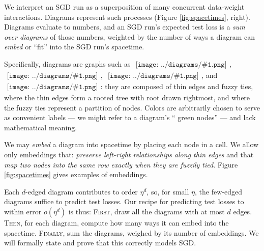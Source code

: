 \documentclass{article}
\newcommand{\sdia}[1]{\begin{gathered}\texttt{[image: ../diagrams/\#1.png]}\end{gathered}}
\begin{document}
            We interpret an SGD run as a superposition of many concurrent
            data-weight interactions.  Diagrams represent such
            processes (Figure \ref{fig:spacetimes}, right).  Diagrams evaluate
            to numbers, and an SGD run's expected test loss is a \emph{sum over
            diagrams} of those numbers, weighted by the number of ways a
            diagram can \emph{embed} or ``fit'' into the SGD run's spacetime.

            Specifically, diagrams are graphs such as $\sdia{(0-1)(01)}$, 
            $\sdia{(01-2)(02-12)}$, $\sdia{(01-2)(01-12)}$, and
            $\sdia{(0-123)(02-12-23)}$: they are
            composed of thin edges and fuzzy ties, where the thin edges form a
            rooted tree with root drawn rightmost, and where the fuzzy ties
            represent a partition of nodes.  Colors are arbitrarily chosen to
            serve as convenient labels --- we might refer to a diagram's ``
            green nodes'' --- and lack mathematical meaning.

            We may \emph{embed} a diagram into spacetime by placing each node
            in a cell.  We allow only embeddings that: \emph{preserve
            left-right relationships along thin edges} and that \emph{map two
            nodes into the same row exactly when they are fuzzily tied}.
            Figure \ref{fig:spacetimes} gives examples of embeddings. 

            Each $d$-edged diagram contributes to order $\eta^d$, so, for small
            $\eta$, the few-edged diagrams suffice to predict test losses.  Our
            recipe for predicting test losses to within error $o(\eta^d)$ is
            thus: \textsc{First}, draw all the diagrams with at most $d$ edges.
            \textsc{Then}, for each diagram, compute how many ways it can
            embed into the spacetime.  \textsc{Finally}, sum the diagrams,
            weighed by its number of embeddings.  We will formally state and
            prove that this correctly models SGD. 

\end{document}
